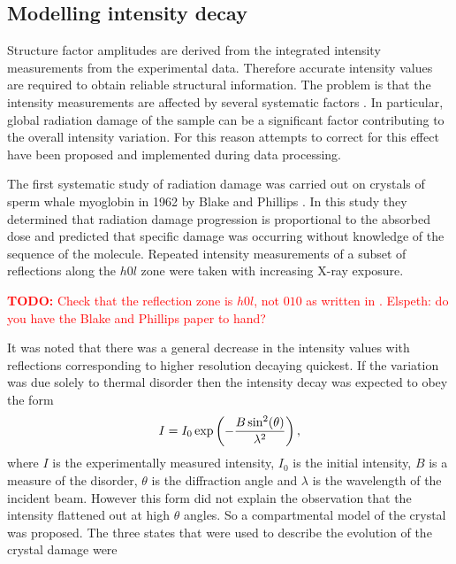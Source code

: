     \subsection{Modelling intensity decay}
    \label{sub:Modelling intensity decay}
        Structure factor amplitudes are derived from the integrated intensity measurements from the experimental data.
        Therefore accurate intensity values are required to obtain reliable structural information. 
		The problem is that the intensity measurements are affected by several systematic factors \cite{evans2005}. 
		In particular, global radiation damage of the sample can be a significant factor contributing to the overall intensity variation. 
		For this reason attempts to correct for this effect have been proposed and implemented during data processing.

        The first systematic study of radiation damage was carried out on crystals of sperm whale myoglobin in 1962 by Blake and Phillips \cite{blake1962}.
        In this study they determined that radiation damage progression is proportional to the absorbed dose and predicted that specific damage was occurring without knowledge of the sequence of the molecule.
        Repeated intensity measurements of a subset of reflections along the $h0l$ zone were taken with increasing X-ray exposure.
        \textcolor{red}{
            \begin{myenumerate}
                \item \hypertarget{todo:checkrefzone}{\textbf{TODO:} Check that the reflection zone is $h0l$, not $010$ as written in \cite{south2007}. Elspeth: do you have the Blake and Phillips paper to hand?}
            \end{myenumerate}
        }
        It was noted that there was a general decrease in the intensity values with reflections corresponding to higher resolution decaying quickest.
        If the variation was due solely to thermal disorder then the intensity decay was expected to obey the form
        \begin{equation}
            I = I_0 \exp\left(-\frac{B \sin^2(\theta)}{\lambda^2} \right),
        \end{equation}
        where $I$ is the experimentally measured intensity, $I_0$ is the initial intensity, $B$ is a measure of the disorder, $\theta$ is the diffraction angle and $\lambda$ is the wavelength of the incident beam.
        However this form did not explain the observation that the intensity flattened out at high $\theta$ angles.
        So a compartmental model of the crystal was proposed. The three states that were used to describe the evolution of the crystal damage were
